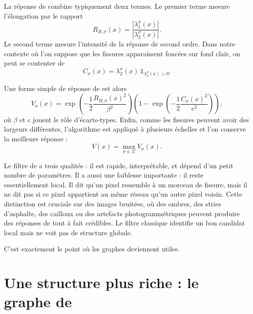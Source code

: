 La réponse de \Frangi{} combine typiquement deux termes. Le premier terme mesure l'élongation par le rapport
\begin{equation}
    R_{B,\sigma}(x)
    =
    \frac{|\lambda_1^\sigma(x)|}{|\lambda_2^\sigma(x)|}.
    \label{eq:chapIII_frangi_ratio}
\end{equation}
Le second terme mesure l'intensité de la réponse de second ordre. Dans notre contexte où l'on suppose que les fissures apparaissent foncées sur fond clair, on peut se contenter de
\begin{equation}
    C_\sigma(x)
    =
    \lambda_2^\sigma(x)\,\mathds{1}_{\lambda_2^\sigma(x)>0}.
    \label{eq:chapIII_curvature_positive}
\end{equation}




Une forme simple de réponse de \Frangi{} est alors
\begin{equation}
    V_\sigma(x)
    =
    \exp\left(-\frac12\frac{R_{B,\sigma}(x)^2}{\beta^2}\right)
    \left(1-\exp\left(-\frac12\frac{C_\sigma(x)^2}{c^2}\right)\right),
    \label{eq:chapIII_frangi_response}
\end{equation}
où $\beta$ et $c$ jouent le rôle d'écarts-types. Enfin, comme les fissures peuvent avoir des largeurs différentes, l'algorithme est appliqué à plusieurs échelles et l'on conserve la meilleure réponse :
\begin{equation}
    V(x)=\max_{\sigma\in\Sigma} V_\sigma(x).
\end{equation}

Le filtre de \Frangi{} a trois qualités : il est rapide, interprétable, et dépend d'un petit nombre de paramètres. Il a aussi une faiblesse importante : il reste essentiellement local. Il dit qu'un pixel ressemble à un morceau de fissure, mais il ne dit pas si ce pixel appartient au même réseau qu'un autre pixel voisin. Cette distinction est cruciale sur des images bruitées, où des ombres, des stries d'asphalte, des cailloux ou des artefacts photogrammétriques peuvent produire des réponses de \Frangi{} tout à fait crédibles. Le filtre classique identifie un bon candidat local mais ne voit pas de structure globale.

C'est exactement le point où les graphes deviennent utiles.

\section{Une structure plus riche : le graphe de \Frangi}
\label{sec:chapIII_graphe_frangi}

